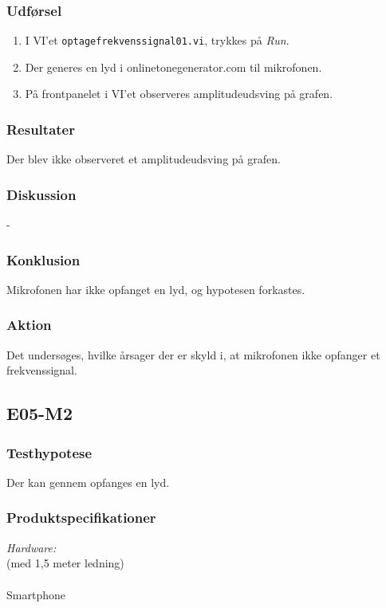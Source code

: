 		\subsubsection{Udførsel}
			\begin{enumerate}
				\item I VI'et \texttt{optagefrekvenssignal01.vi}, trykkes på \textit{Run}.  
				\item Der generes en lyd i onlinetonegenerator.com til mikrofonen. 
				\item På frontpanelet i VI'et observeres amplitudeudsving på grafen.  
			\end{enumerate}
		
		\subsubsection{Resultater}
		Der blev ikke observeret et amplitudeudsving på grafen. 
		\subsubsection{Diskussion} 
		-
		\subsubsection{Konklusion}
		Mikrofonen har ikke opfanget en lyd, og hypotesen forkastes. 
		\subsubsection{Aktion}
		Det undersøges, hvilke årsager der er skyld i, at mikrofonen ikke opfanger et frekvenssignal.  
		
	\subsection{E05-M2}
		\subsubsection{Testhypotese}
		Der kan gennem \webcammic{} opfanges en lyd.  
		
		\subsubsection{Produktspecifikationer}
	
			\textit{Hardware:}\\
			\webcammic{} (med 1,5 meter ledning)\\
			\PC\\
			Smartphone
	

